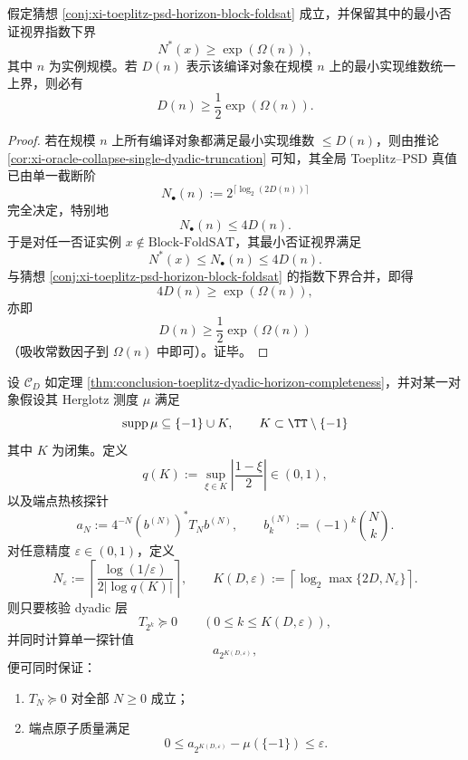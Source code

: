 \begin{theorem}\label{thm:conclusion-toeplitz-np-compilation-forces-exponential-realization-degree}
假定猜想 \ref{conj:xi-toeplitz-psd-horizon-block-foldsat} 成立，并保留其中的最小否证视界指数下界
\[
N^\ast(x)\ge \exp(\Omega(n)),
\]
其中 \(n\) 为实例规模。若 \(D(n)\) 表示该编译对象在规模 \(n\) 上的最小实现维数统一上界，则必有
\[
D(n)\ge \frac12 \exp(\Omega(n)).
\]
\end{theorem}

\begin{proof}
若在规模 \(n\) 上所有编译对象都满足最小实现维数 \(\le D(n)\)，则由推论 \ref{cor:xi-oracle-collapse-single-dyadic-truncation} 可知，其全局 Toeplitz--PSD 真值已由单一截断阶
\[
N_\bullet(n):=2^{\lceil \log_2(2D(n))\rceil}
\]
完全决定，特别地
\[
N_\bullet(n)\le 4D(n).
\]
于是对任一否证实例 \(x\notin \mathrm{Block\text{-}FoldSAT}\)，其最小否证视界满足
\[
N^\ast(x)\le N_\bullet(n)\le 4D(n).
\]
与猜想 \ref{conj:xi-toeplitz-psd-horizon-block-foldsat} 的指数下界合并，即得
\[
4D(n)\ge \exp(\Omega(n)),
\]
亦即
\[
D(n)\ge \frac12 \exp(\Omega(n))
\]
（吸收常数因子到 \(\Omega(n)\) 中即可）。证毕。
\end{proof}

\begin{theorem}\label{thm:conclusion-toeplitz-endpoint-atom-dyadic-joint-verification}
设 \(\mathcal C_D\) 如定理 \ref{thm:conclusion-toeplitz-dyadic-horizon-completeness}，并对某一对象假设其 Herglotz 测度 \(\mu\) 满足
\[
\operatorname{supp}\mu\subseteq \{-1\}\cup K,
\qquad
K\subset \TT\setminus \{-1\}
\]
其中 \(K\) 为闭集。定义
\[
q(K):=\sup_{\xi\in K}\left|\frac{1-\xi}{2}\right|\in(0,1),
\]
以及端点热核探针
\[
a_N:=4^{-N}(b^{(N)})^\ast T_N b^{(N)},
\qquad
b_k^{(N)}:=(-1)^k\binom{N}{k}.
\]
对任意精度 \(\varepsilon\in(0,1)\)，定义
\[
N_\varepsilon:=
\left\lceil \frac{\log(1/\varepsilon)}{2|\log q(K)|}\right\rceil,
\qquad
K(D,\varepsilon):=
\left\lceil
\log_2 \max\{2D,N_\varepsilon\}
\right\rceil .
\]
则只要核验 dyadic 层
\[
T_{2^k}\succeq0
\qquad (0\le k\le K(D,\varepsilon)),
\]
并同时计算单一探针值
\[
a_{2^{K(D,\varepsilon)}} ,
\]
便可同时保证：
\begin{enumerate}
  \item \(T_N\succeq0\) 对全部 \(N\ge0\) 成立；
  \item 端点原子质量满足
  \[
  0\le a_{2^{K(D,\varepsilon)}}-\mu(\{-1\})\le \varepsilon.
  \]
\end{enumerate}
\end{theorem}

